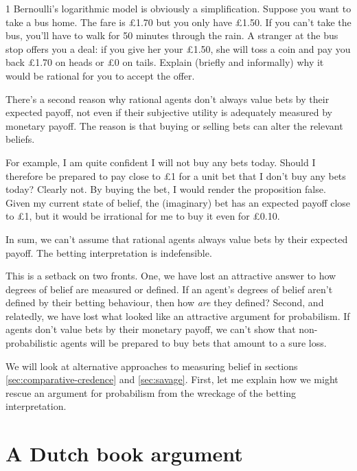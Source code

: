 \begin{exercise}{1}
  Bernoulli's logarithmic model is obviously a simplification. Suppose you want
  to take a bus home. The fare is £1.70 but you only have £1.50. If you can't
  take the bus, you'll have to walk for 50 minutes through the rain. A stranger
  at the bus stop offers you a deal: if you give her your £1.50, she will toss a
  coin and pay you back £1.70 on heads or £0 on tails. Explain (briefly and
  informally) why it would be rational for you to accept the offer.
\end{exercise}

There's a second reason why rational agents don't always value bets by their
expected payoff, not even if their subjective utility is adequately measured by
monetary payoff. The reason is that buying or selling bets can alter the
relevant beliefs.

For example, I am quite confident I will not buy any bets today. Should I
therefore be prepared to pay close to £1 for a unit bet that I don't buy any
bets today? Clearly not. By buying the bet, I would render the proposition
false. Given my current state of belief, the (imaginary) bet has an expected
payoff close to £1, but it would be irrational for me to buy it even for £0.10.

In sum, we can't assume that rational agents always value bets by their expected
payoff. The betting interpretation is indefensible.

This is a setback on two fronts. One, we have lost an attractive answer to how
degrees of belief are measured or defined. If an agent's degrees of belief
aren't defined by their betting behaviour, then how \emph{are} they defined?
Second, and relatedly, we have lost what looked like an attractive argument for
probabilism. If agents don't value bets by their monetary payoff, we can't show
that non-probabilistic agents will be prepared to buy bets that amount to a sure
loss.

We will look at alternative approaches to measuring belief in sections
\ref{sec:comparative-credence} and \ref{sec:savage}. First, let me explain how
we might rescue an argument for probabilism from the wreckage of the
betting interpretation.

\section{A Dutch book argument}\label{sec:my-dba}

